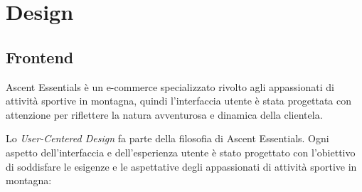 \chapter{Design}

\section{Frontend}



Ascent Essentials è un e-commerce specializzato rivolto agli appassionati di attività sportive in montagna, quindi l'interfaccia utente è stata progettata con attenzione per riflettere la natura avventurosa e dinamica della clientela.

Lo \textit{User-Centered Design} fa parte della filosofia di Ascent Essentials. Ogni aspetto dell'interfaccia e dell'esperienza utente è stato progettato con l'obiettivo di soddisfare le esigenze e le aspettative degli appassionati di attività sportive in montagna:

